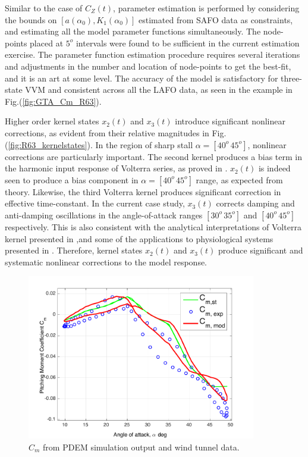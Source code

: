 \documentclass{AIAA}
\begin{document}
Similar to the case of $C_Z(t)$, parameter estimation is performed by considering the bounds on $[a(\alpha_0),K_1(\alpha_0)]$ estimated from SAFO data as constraints, and estimating all the model parameter functions simultaneously. The node-points placed at $5^o$ intervals were found to be sufficient in the current estimation exercise.   The parameter function estimation procedure requires several iterations and adjustments in the number and location of node-points to get the best-fit, and it is an art at some level. The accuracy of the model is satisfactory for three-state VVM and consistent across all the LAFO data, as seen in the example in Fig.(\ref{fig:GTA_Cm_R63}).
 
 
Higher order kernel states $x_2(t)$ and $x_3(t)$ introduce significant nonlinear corrections, as evident from their relative magnitudes in Fig.(\ref{fig:R63_kernelstates}).  In the region of sharp stall $\alpha=[40^o \, 45^o]$, nonlinear corrections are particularly important. The second kernel produces a bias term in the harmonic input response of Volterra series, as proved in \cite{Bedrosian}. $x_2(t)$ is indeed seen to produce a bias component in $\alpha=[40^o \, 45^o]$ range, as expected from theory. Likewise, the third Volterra kernel produces significant correction in effective time-constant. In the current case study, $x_3(t)$ corrects damping and anti-damping oscillations in the angle-of-attack ranges $[30^o \, 35^o]$ and  $[40^o \, 45^o]$ respectively. This is also consistent with the analytical interpretations of Volterra kernel presented in \cite{OmranACC},and some of the applications to physiological systems presented in \cite{Marmerelis}. Therefore, kernel states $x_2(t)$ and $x_3(t)$ produce significant and systematic nonlinear corrections to the model response.

\begin{figure}[htbp]
\begin{center}
\includegraphics[width=100mm]{PDEM_Cm_R63}
\caption{$C_m$ from PDEM simulation output and wind tunnel data.}
\label{fig:PDEM_Cm_R63}
\end{center}
\end{figure}
\end{document}
